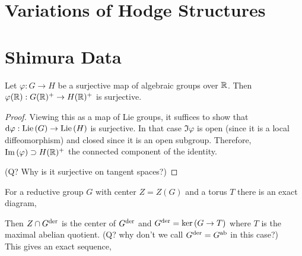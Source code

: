 \documentclass[12pt]{article}
\begin{document}
\section{Variations of Hodge Structures}

\section{Shimura Data}

\begin{prop}
Let $\varphi : G \to H$ be a surjective map of algebraic groups over $\mathbb{R}$. Then $\varphi(\mathbb{R}) : G(\mathbb{R})^+ \to H(\mathbb{R})^+$ is surjective.
\end{prop}

\begin{proof}
Viewing this as a map of Lie groups, it suffices to show that $\mathrm{d}{\varphi} : \mathrm{Lie}\left( G \right) \to \mathrm{Lie}\left( H \right)$ is surjective. In that case $\Im{\varphi}$ is open (since it is a local diffeomorphism) and closed since it is an open subgroup. Therefore,  $\mathrm{Im}\left( \varphi \right) \supset H(\mathbb{R})^+$ the connected component of the identity.

(Q? Why is it surjective on tangent spaces?)
\end{proof}

\begin{rmk}
For a reductive group $G$ with center $Z = Z(G)$ and a torus $T$ there is an exact diagram,
\begin{center}
\end{center}
Then $Z \cap G^{\mathrm{der}}$ is the center of $G^{\mathrm{der}}$ and $G^{\mathrm{der}} = \ker{(G \to T)}$ where $T$ is the maximal abelian quotient. (Q? why don't we call $G^{\mathrm{der}} = G^{\mathrm{ab}}$ in this case?)
\bigskip\\
This gives an exact sequence,
\begin{center}
\end{center}
\end{rmk}
\end{document}
